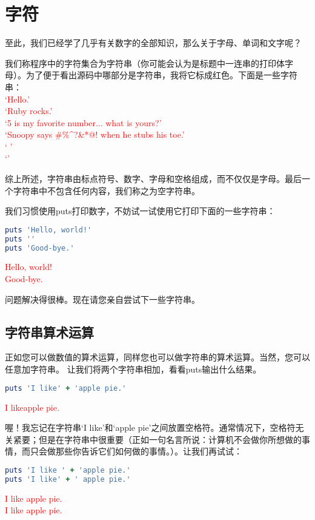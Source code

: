 \chapter{字符}

至此，我们已经学了几乎有关数字的全部知识，那么关于字母、单词和文字呢？

我们称程序中的字符集合为字符串（你可能会认为是标题中一连串的打印体字母）。为了便于看出源码中哪部分是字符串，我将它标成红色。下面是一些字符串：\\
\textcolor{red}{
\textquoteleft{Hello.}\textquoteright\\
\textquoteleft{Ruby rocks.}\textquoteright\\
\textquoteleft{5 is my favorite number... what is yours?}\textquoteright\\
\textquoteleft{Snoopy says \#\%\^{}?\&*@! when he stubs his toe.}\textquoteright\\
\textquoteleft{     }\textquoteright\\
\textquoteleft{}\textquoteright
}

综上所述，字符串由标点符号、数字、字母和空格组成，而不仅仅是字母。最后一个字符串中不包含任何内容，我们称之为空字符串。

我们习惯使用puts打印数字，不妨试一试使用它打印下面的一些字符串：
\begin{lstlisting}[language=ruby]
puts 'Hello, world!'
puts ''
puts 'Good-bye.'
\end{lstlisting}
\textcolor{red}{
Hello, world!\\
Good-bye.
}

问题解决得很棒。现在请您亲自尝试下一些字符串。

\section{字符串算术运算}

正如您可以做数值的算术运算，同样您也可以做字符串的算术运算。当然，您可以任意加字符串。
让我们将两个字符串相加，看看puts输出什么结果。
\begin{lstlisting}[language=ruby]
puts 'I like' + 'apple pie.'
\end{lstlisting}
\textcolor{red}{
I likeapple pie.
}

喔！我忘记在字符串`I like'和`apple pie'之间放置空格符。通常情况下，空格符无关紧要；但是在字符串中很重要（正如一句名言所说：计算机不会做你所想做的事情，而只会做那些你告诉它们如何做的事情。）。让我们再试试：
\begin{lstlisting}[language=ruby]
puts 'I like ' + 'apple pie.'
puts 'I like' + ' apple pie.'
\end{lstlisting}
\textcolor{red}{
I like apple pie.\\
I like apple pie.
}

